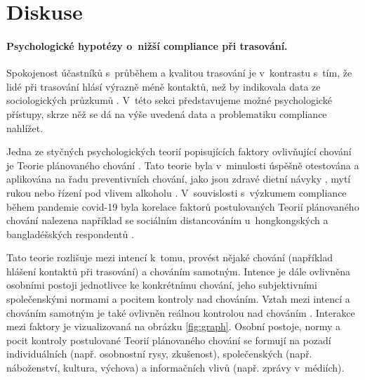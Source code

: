 \section*{Diskuse}
\paragraph*{Psychologické hypotézy o~nižší compliance při trasování.}
Spokojenost účast\-ní\-ků s~průběhem a kvalitou trasování je v~kontrastu s~tím, že lidé při trasování hlásí výrazně méně kontaktů, než by indikovala data ze sociologických průzkumů \cite{Prokop2020a}. V~této sekci představujeme možné psychologické přístupy, skrze něž se dá na výše uvedená data a problematiku compliance nahlížet.  

Jedna ze styčných psychologických teorií popisujících faktory ovlivňující chování je Teorie plánovaného chování \cite{Ajzen1985}. Tato teorie byla v~minulosti úspěšně otestována a aplikována na řadu preventivních chování, jako jsou zdravé dietní návyky \cite{Hackman2014}, mytí rukou \cite{Hackman2014} nebo řízení pod vlivem alkoholu \cite{Moan2011}. V~souvislosti s~výzkumem compliance během pandemie covid-19 byla korelace faktorů postulovaných Teorií plánovaného chování nalezena například se sociálním distancováním u~hongkongských \cite{Yu2021} a bangladéšských respondentů \cite{Das2021}. 

Tato teorie rozlišuje mezi intencí k~tomu, provést nějaké chování (například hlášení kontaktů při trasování) a chováním samotným. Intence je dále ovlivněna osobními postoji jednotlivce ke konkrétnímu chování, jeho subjektivními spo\-le\-čen\-ský\-mi normami a pocitem kontroly nad chováním. 
Vztah mezi intencí a chováním samotným je také ovlivněn reálnou kontrolou nad chováním \cite{Ajzen1985}. Interakce mezi faktory je vizualizovaná na obrázku \ref{fig:graph}. Osobní postoje, normy a pocit kontroly postulované Teorií plánovaného chování se formují na pozadí individuálních (např. osobnostní rysy, zkušenost), společenských (např. náboženství, kultura, vý\-cho\-va) a informačních vlivů (např. zprávy v~médiích). 

